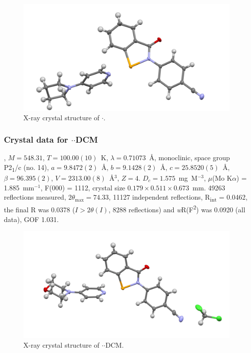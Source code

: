 \begin{refsection}
\begin{figure}
  \includegraphics[width=0.6\linewidth]{Figures/ebs-4cn-pyrrol-xtal.pdf}
  \caption{X-ray crystal structure of \texorpdfstring{$ \cdot $}{C23 H20 N4 O Se}.}
\end{figure}

\subsubsection{Crystal data for \texorpdfstring{$ \cdot $$ \cdot $DCM}{C24 H22 Cl2 N4 O2 Se}}
, $M=548.31$, $T=100.00(10)$~K, $ \lambda=0.71073 $~\AA, monoclinic, space group P2\textsubscript{1}/c (no. 14), $a = 9.8472(2)$~\AA, $b = 9.1428(2)$~\AA, $c = 25.8520(5)$~\AA, $\beta = 96.395(2)$\degree, $V = 2313.00(8)$~\AA$^{3}$, $Z = 4$. $D_{c}= 1.575$~mg~M$^{-3}$, $\mu$(Mo K$\alpha$) = 1.885~mm$^{-1}$, F(000) = 1112, crystal size $0.179 \times 0.511 \times 0.673$~mm. 49263 reflections measured, $2\theta_{\max}=74.33$\degree, 11127 independent reflections, R\textsubscript{int} = 0.0462, the final R was 0.0378 ($I > 2\theta(I)$, 8288 reflections) and \textit{w}R(F\textsuperscript{2}) was 0.0920 (all data), GOF 1.031.

\begin{figure}
  \includegraphics[width=0.6\linewidth]{Figures/ebs-4cn-morph-dcm-xtal.pdf}
  \caption{X-ray crystal structure of \texorpdfstring{$ \cdot $$ \cdot $DCM}{C24 H22 Cl2 N4 O2 Se}.}
\end{figure}


\end{refsection}
